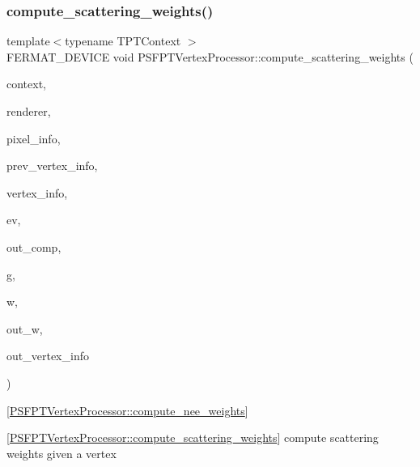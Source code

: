 \subsubsection{\texorpdfstring{compute\+\_\+scattering\+\_\+weights()}{compute\_scattering\_weights()}}
{\footnotesize\ttfamily template$<$typename T\+P\+T\+Context $>$ \\
F\+E\+R\+M\+A\+T\+\_\+\+D\+E\+V\+I\+CE void P\+S\+F\+P\+T\+Vertex\+Processor\+::compute\+\_\+scattering\+\_\+weights (\begin{DoxyParamCaption}\item[{const T\+P\+T\+Context \&}]{context,  }\item[{const \hyperlink{struct_rendering_context_view}{Rendering\+Context\+View} \&}]{renderer,  }\item[{const \hyperlink{union_pixel_info}{Pixel\+Info}}]{pixel\+\_\+info,  }\item[{const uint32}]{prev\+\_\+vertex\+\_\+info,  }\item[{const uint32}]{vertex\+\_\+info,  }\item[{const \hyperlink{struct_eye_vertex}{Eye\+Vertex} \&}]{ev,  }\item[{const uint32}]{out\+\_\+comp,  }\item[{const \hyperlink{structcugar_1_1_vector}{cugar\+::\+Vector3f} \&}]{g,  }\item[{const \hyperlink{structcugar_1_1_vector}{cugar\+::\+Vector3f} \&}]{w,  }\item[{\hyperlink{structcugar_1_1_vector}{cugar\+::\+Vector3f} \&}]{out\+\_\+w,  }\item[{uint32 \&}]{out\+\_\+vertex\+\_\+info }\end{DoxyParamCaption})\hspace{0.3cm}{\ttfamily [inline]}}



\mbox{[}\hyperlink{struct_p_s_f_p_t_vertex_processor_ad0208c56ea8196913977b3029c14be61}{P\+S\+F\+P\+T\+Vertex\+Processor\+::compute\+\_\+nee\+\_\+weights}\mbox{]} 

\mbox{[}\hyperlink{struct_p_s_f_p_t_vertex_processor_afa5301047bd57d917658b4b8eb2bd075}{P\+S\+F\+P\+T\+Vertex\+Processor\+::compute\+\_\+scattering\+\_\+weights}\mbox{]} compute scattering weights given a vertex


